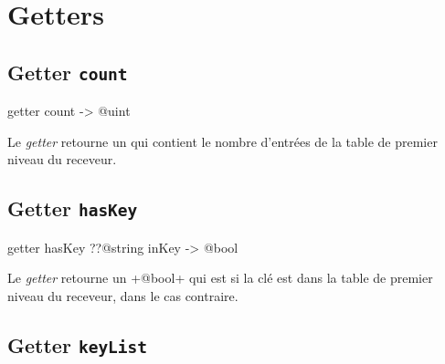 \section{Getters}

%
%

\subsection{Getter \texttt{count}}

\begin{galgascode}
getter count -> @uint
\end{galgascode}


Le \emph{getter}  retourne un  qui contient le nombre d'entrées de la table de premier niveau du receveur.



\subsection{Getter \texttt{hasKey}}

\begin{galgascode}
getter hasKey ??@string inKey -> @bool
\end{galgascode}


Le \emph{getter}  retourne un \ggs+@bool+ qui est  si la clé  est dans la table de premier niveau du receveur,  dans le cas contraire.



\subsection{Getter \texttt{keyList}}

